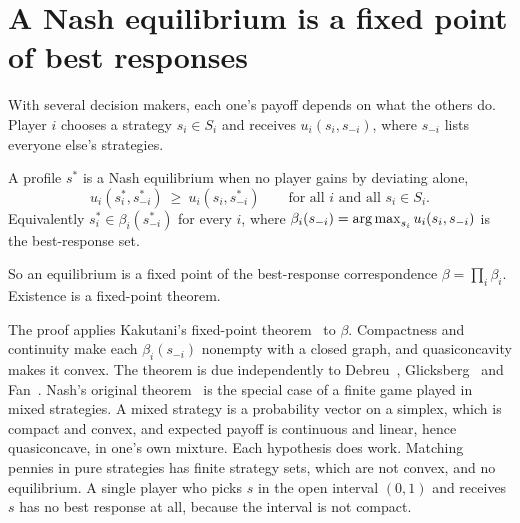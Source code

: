 

\section{A Nash equilibrium is a fixed point of best responses}\label{sec:ch08:nash}

With several decision makers, each one's payoff depends on what the others do. Player $i$ chooses a strategy $s_i\in S_i$ and receives $u_i(s_i,s_{-i})$, where $s_{-i}$ lists everyone else's strategies.

\begin{definition}\label{def:ch08:nash}
A profile $s^*$ is a Nash equilibrium when no player gains by deviating alone,
\begin{equation}\label{eq:ch08:nash}
u_i(s_i^*,s_{-i}^*)\ \ge\ u_i(s_i,s_{-i}^*)\qquad\text{for all }i\text{ and all }s_i\in S_i .
\end{equation}
Equivalently $s_i^*\in\beta_i(s^*_{-i})$ for every $i$, where $\beta_i(s_{-i})=\operatorname*{arg\,max}_{s_i}u_i(s_i,s_{-i})$ is the best-response set.
\end{definition}

So an equilibrium is a fixed point of the best-response correspondence $\beta=\prod_i\beta_i$. Existence is a fixed-point theorem.


The proof applies Kakutani's fixed-point theorem~\cite{kakutani1941} to $\beta$. Compactness and continuity make each $\beta_i(s_{-i})$ nonempty with a closed graph, and quasiconcavity makes it convex. The theorem is due independently to Debreu~\cite{debreu1952}, Glicksberg~\cite{glicksberg1952} and Fan~\cite{fan1952}. Nash's original theorem~\cite{nash1950} is the special case of a finite game played in mixed strategies. A mixed strategy is a probability vector on a simplex, which is compact and convex, and expected payoff is continuous and linear, hence quasiconcave, in one's own mixture. Each hypothesis does work. Matching pennies in pure strategies has finite strategy sets, which are not convex, and no equilibrium. A single player who picks $s$ in the open interval $(0,1)$ and receives $s$ has no best response at all, because the interval is not compact.

